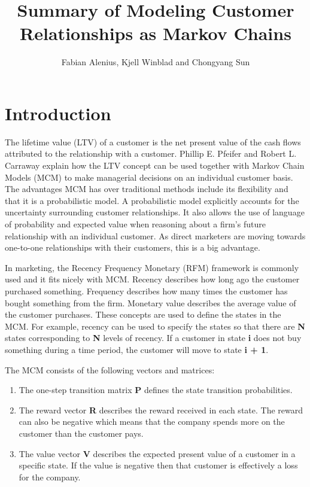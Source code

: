 \documentclass[11pt]{article}
\author{Fabian Alenius, Kjell Winblad and Chongyang Sun}
\title{Summary of Modeling Customer Relationships as Markov Chains}
\begin{document}
\maketitle


\section{Introduction}
The lifetime value (LTV) of a customer is the net present value of the cash flows attributed to the relationship with a customer.
Phillip E. Pfeifer and Robert L. Carraway \cite{customer} explain how the LTV concept can be used together with Markov Chain Models (MCM) to make managerial decisions on an individual customer basis. %
The advantages MCM has over traditional methods include its flexibility and that it is a probabilistic model.
A probabilistic model explicitly accounts for the uncertainty surrounding customer relationships.
It also allows the use of language of probability and expected value when reasoning about a firm's future relationship with an individual customer.
As direct marketers are moving towards one-to-one relationships with their customers, this is a big advantage.

In marketing, the Recency Frequency Monetary (RFM) framework is commonly used and it fits nicely with MCM.
Recency describes how long ago the customer purchased something.
Frequency describes how many times the customer has bought something from the firm.
Monetary value describes the average value of the customer purchases.
These concepts are used to define the states in the MCM.
For example, recency can be used to specify the states so that there are \textbf{N} states corresponding to  \textbf{N}  levels of recency.
If a customer in state \textbf{i} does not buy something during a time period, the customer will move to state \textbf{i + 1}.

The MCM consists of the following vectors and matrices: 
\begin{enumerate}
\item The one-step transition matrix \textbf{P} defines the state transition probabilities.
\item The reward vector \textbf{R} describes the reward received in each state. The reward can also be negative which means that the company spends more on the customer than the customer pays.
\item The value vector \textbf{V} describes the expected present value of a customer in a specific state. If the value is negative then that customer is effectively a loss for the company.
\end{enumerate}
\end{document}
